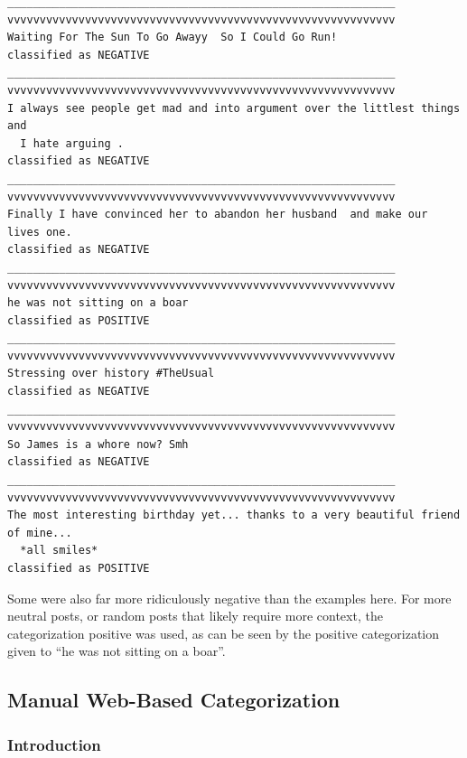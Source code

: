 \documentclass[12pt,a4paper]{article}
\begin{document}
\begin{verbatim}
____________________________________________________________
vvvvvvvvvvvvvvvvvvvvvvvvvvvvvvvvvvvvvvvvvvvvvvvvvvvvvvvvvvvv
Waiting For The Sun To Go Awayy  So I Could Go Run!
classified as NEGATIVE
____________________________________________________________
vvvvvvvvvvvvvvvvvvvvvvvvvvvvvvvvvvvvvvvvvvvvvvvvvvvvvvvvvvvv
I always see people get mad and into argument over the littlest things  and
  I hate arguing .
classified as NEGATIVE
____________________________________________________________
vvvvvvvvvvvvvvvvvvvvvvvvvvvvvvvvvvvvvvvvvvvvvvvvvvvvvvvvvvvv
Finally I have convinced her to abandon her husband  and make our lives one.
classified as NEGATIVE
____________________________________________________________
vvvvvvvvvvvvvvvvvvvvvvvvvvvvvvvvvvvvvvvvvvvvvvvvvvvvvvvvvvvv
he was not sitting on a boar
classified as POSITIVE
____________________________________________________________
vvvvvvvvvvvvvvvvvvvvvvvvvvvvvvvvvvvvvvvvvvvvvvvvvvvvvvvvvvvv
Stressing over history #TheUsual
classified as NEGATIVE
____________________________________________________________
vvvvvvvvvvvvvvvvvvvvvvvvvvvvvvvvvvvvvvvvvvvvvvvvvvvvvvvvvvvv
So James is a whore now? Smh
classified as NEGATIVE
____________________________________________________________
vvvvvvvvvvvvvvvvvvvvvvvvvvvvvvvvvvvvvvvvvvvvvvvvvvvvvvvvvvvv
The most interesting birthday yet... thanks to a very beautiful friend of mine...
  *all smiles*
classified as POSITIVE
\end{verbatim}

Some were also far more ridiculously negative than the examples here.  For more neutral posts, or random posts that likely require more context, the categorization positive was used, as can be seen by the positive categorization given to ``he was not sitting on a boar''.

\subsection { Manual Web-Based Categorization }

\subsubsection{Introduction}
\end{document}
